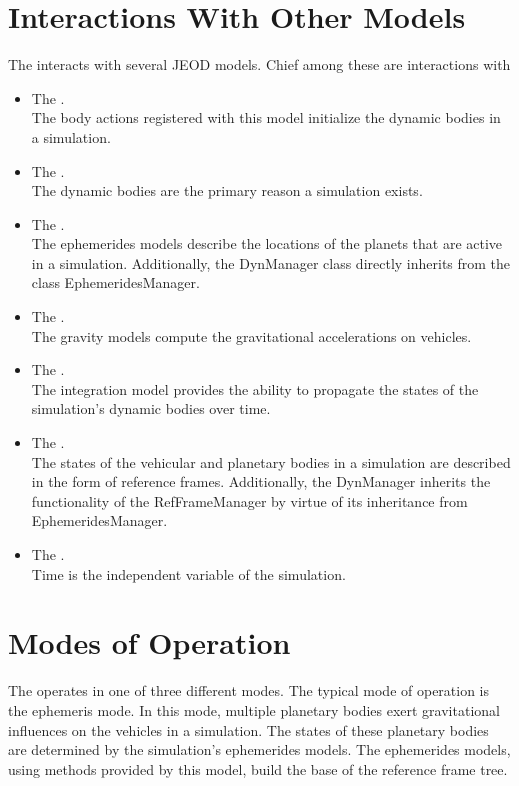 \section*{Interactions With Other Models}
The \ModelDesc interacts with several JEOD models. Chief among these
are interactions with\begin{itemize}
\item The . \\
The body actions registered with this model initialize the dynamic bodies
in a simulation.
\item The . \\
The dynamic bodies are the primary reason a simulation exists.
\item The . \\
The ephemerides models describe the locations of the planets
that are active in a simulation. Additionally, the DynManager
class directly inherits from the class EphemeridesManager.
\item The . \\
The gravity models compute the gravitational accelerations on
vehicles.
\item The . \\
The integration model provides the ability to propagate the states
of the simulation's dynamic bodies over time.
\item The . \\
The states of the vehicular and planetary bodies in a simulation
are described in the form of reference frames. Additionally,
the DynManager inherits the functionality of the
RefFrameManager by virtue of its inheritance from EphemeridesManager.
\item The . \\
Time is the independent variable of the simulation.
\end{itemize}

\section*{Modes of Operation}
The \ModelDesc operates in one of three different modes. The typical mode of
operation is the ephemeris mode. In this mode, multiple planetary bodies
exert gravitational influences on the vehicles in a simulation.
The states of these planetary bodies are determined by the simulation's
ephemerides models. The ephemerides models, using methods provided by this
model, build the base of the reference frame tree.

